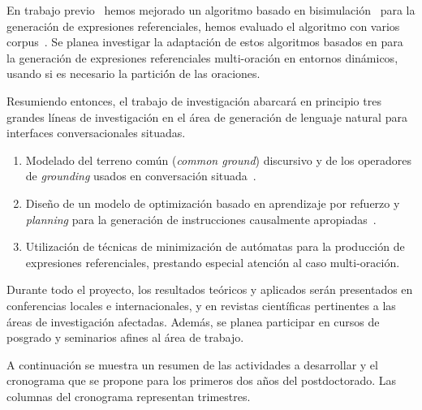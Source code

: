 \documentclass[10.9pt,a4paper]{article}
\begin{document}
En trabajo previo~\citep{altamirano-areces-benotti:2012:POSTERS} hemos mejorado un algoritmo basado en 
bisimulaci\'on~\citep{arec:refe08} para la generaci\'on de expresiones referenciales, hemos evaluado el algoritmo con varios corpus~\citep{altamirano-areces-benotti:2012:POSTERS, beno:context2013}. Se planea investigar la adaptaci\'on de estos algoritmos basados en para la generaci\'on de 
expresiones referenciales multi-oraci\'on en entornos din\'amicos, usando si es necesario la partici\'ón de las oraciones.

Resumiendo entonces, el trabajo de investigaci\'on abarcar\'a en principio tres grandes l\'ineas 
de investigaci\'on en el \'area de generaci\'on de lenguaje natural para interfaces conversacionales 
situadas.
\begin{enumerate}

    \item Modelado del terreno com\'un (\emph{common ground}) 
    discursivo y de los operadores de \emph{grounding} usados en 
    conversaci\'on situada~\citep{benotti-EtAl:2012:ACL2012short}.

    \item Dise\~no de un modelo de optimizaci\'on basado en aprendizaje 
    por refuerzo y \emph{planning} para la generaci\'on de instrucciones 
    causalmente apropiadas~\citep{beno:acl11}.

    \item Utilizaci\'on de t\'ecnicas de minimizaci\'on de aut\'omatas para la 
    producci\'on de expresiones referenciales, prestando especial atenci\'on 
    al caso multi-oraci\'on.

\end{enumerate}

Durante todo el proyecto, los resultados te\'oricos y aplicados ser\'an 
presentados en conferencias locales e internacionales, y en revistas 
cient\'ificas pertinentes a las \'areas de investigaci\'on afectadas.
Adem\'as, se planea participar en cursos de posgrado y seminarios afines
al \'area de trabajo. 

A continuaci\'on se muestra un resumen de las actividades a desarrollar y 
el cronograma que se propone para los primeros dos a\~nos del postdoctorado.
Las columnas del cronograma representan trimestres.
\end{document}
